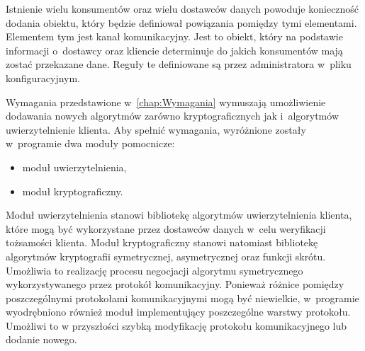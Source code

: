 Istnienie wielu konsumentów oraz wielu dostawców danych powoduje
konieczność dodania obiektu, który będzie definiował powiązania
pomiędzy tymi elementami. Elementem tym jest kanał komunikacyjny. Jest
to obiekt, który na podstawie informacji o~dostawcy oraz kliencie
determinuje do jakich konsumentów mają zostać przekazane dane. Reguły
te definiowane są przez administratora w~pliku konfiguracyjnym.

Wymagania przedstawione w~\ref{chap:Wymagania} wymuszają umożliwienie
dodawania nowych algorytmów zarówno kryptograficznych jak i~algorytmów
uwierzytelnienie klienta. Aby spełnić wymagania, wyróżnione zostały
w~programie dwa moduły pomocnicze:

\begin{itemize}
\item moduł uwierzytelnienia,
\item moduł kryptograficzny.
\end{itemize}

Moduł uwierzytelnienia stanowi bibliotekę algorytmów uwierzytelnienia
klienta, które mogą być wykorzystane przez dostawców danych w~celu
weryfikacji tożsamości klienta. Moduł kryptograficzny stanowi
natomiast bibliotekę algorytmów kryptografii symetrycznej,
asymetrycznej oraz funkcji skrótu. Umożliwia to realizację procesu
negocjacji algorytmu symetrycznego wykorzystywanego przez protokół
komunikacyjny. Ponieważ różnice pomiędzy poszczególnymi protokołami
komunikacyjnymi mogą być niewielkie, w~programie wyodrębniono również
moduł implementujący poszczególne warstwy protokołu. Umożliwi to w
przyszłości szybką modyfikację protokołu komunikacyjnego lub dodanie
nowego.
